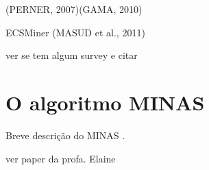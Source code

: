 (PERNER, 2007)(GAMA, 2010)

ECSMiner (MASUD et al., 2011)

ver se tem algum survey e citar

\section{O algoritmo MINAS}\label{sec:minas-og}

Breve descrição do MINAS \cite{Faria2016minas}.



ver paper da profa. Elaine

